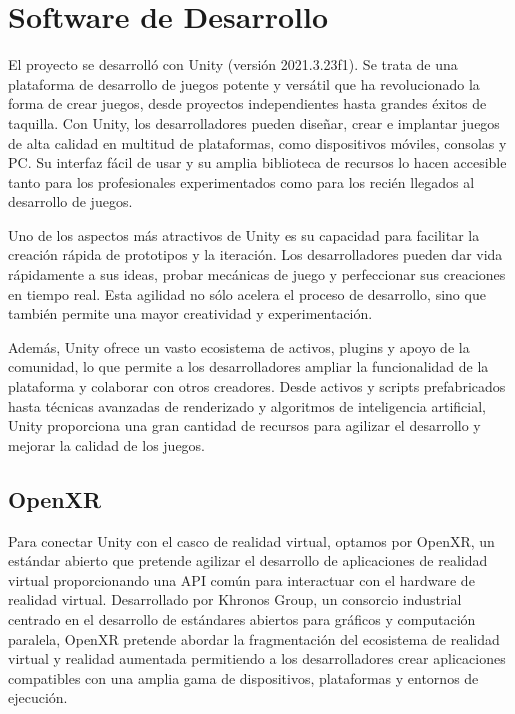  \section{Software de Desarrollo}

El proyecto se desarrolló con Unity (versión 2021.3.23f1). Se trata de una plataforma de desarrollo de juegos potente y versátil que ha revolucionado la forma de crear juegos, desde proyectos independientes hasta grandes éxitos de taquilla. Con Unity, los desarrolladores pueden diseñar, crear e implantar juegos de alta calidad en multitud de plataformas, como dispositivos móviles, consolas y PC. Su interfaz fácil de usar y su amplia biblioteca de recursos lo hacen accesible tanto para los profesionales experimentados como para los recién llegados al desarrollo de juegos.

Uno de los aspectos más atractivos de Unity es su capacidad para facilitar la creación rápida de prototipos y la iteración. Los desarrolladores pueden dar vida rápidamente a sus ideas, probar mecánicas de juego y perfeccionar sus creaciones en tiempo real. Esta agilidad no sólo acelera el proceso de desarrollo, sino que también permite una mayor creatividad y experimentación.

Además, Unity ofrece un vasto ecosistema de activos, plugins y apoyo de la comunidad, lo que permite a los desarrolladores ampliar la funcionalidad de la plataforma y colaborar con otros creadores. Desde activos y scripts prefabricados hasta técnicas avanzadas de renderizado y algoritmos de inteligencia artificial, Unity proporciona una gran cantidad de recursos para agilizar el desarrollo y mejorar la calidad de los juegos.

\subsection{OpenXR}

Para conectar Unity con el casco de realidad virtual, optamos por OpenXR, un estándar abierto que pretende agilizar el desarrollo de aplicaciones de realidad virtual proporcionando una API común para interactuar con el hardware de realidad virtual. Desarrollado por Khronos Group, un consorcio industrial centrado en el desarrollo de estándares abiertos para gráficos y computación paralela, OpenXR pretende abordar la fragmentación del ecosistema de realidad virtual y realidad aumentada permitiendo a los desarrolladores crear aplicaciones compatibles con una amplia gama de dispositivos, plataformas y entornos de ejecución. \cite[]{OpenXR}

